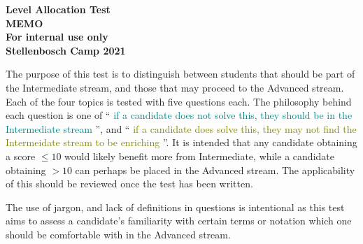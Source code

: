 \documentclass{article}
\newcommand{\mustintermediate}[1]{
    \textcolor{teal}{#1}
}
\newcommand{\canadvanced}[1]{
    \textcolor{olive}{#1}
}
\begin{document}
\thispagestyle{empty}

\begin{center}
  \textbf{\Large Level Allocation Test}
  \\ \vspace{1em}
  \textbf{\Large MEMO}
  \\ \vspace{1em}
  \textbf{\large For internal use only}
  \\ \vspace{1em}
  \textbf{\large Stellenbosch Camp 2021}
\end{center}

\vspace{24pt}

The purpose of this test is to distinguish between students that should be part of the Intermediate stream, and those that may proceed to the Advanced stream.
Each of the four topics is tested with five questions each.
The philosophy behind each question is one of ``\mustintermediate{if a candidate does not solve this, they should be in the Intermediate stream}'', and ``\canadvanced{if a candidate does solve this, they may not find the Intermeidate stream to be enriching}''.
It is intended that any candidate obtaining a score $\le 10$ would likely benefit more from Intermediate, while a candidate obtaining $> 10$ can perhaps be placed in the Advanced stream.
The applicability of this should be reviewed once the test has been written.  

The use of jargon, and lack of definitions in questions is intentional as this test aims to assess a candidate's familiarity with certain terms or notation which one should be comfortable with in the Advanced stream.
\end{document}
